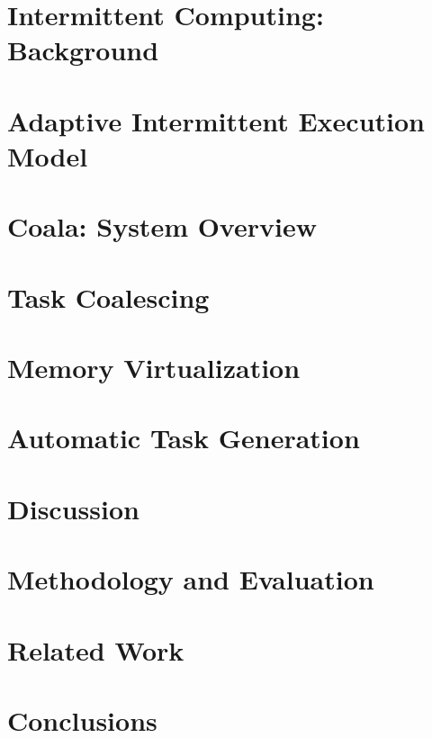 \documentclass[acmsmall,review,anonymous]{acmart}\settopmatter{printfolios=true,printccs=false,printacmref=false}
\newcommand{\sys}{Coala\xspace}
\begin{document}


\section{Intermittent Computing: Background}
\label{sec:background}


\section{Adaptive Intermittent Execution Model}
\label{sec:adaptiveModel}


\section{\sys: System Overview}
\label{sec:overall_system}



\section{Task Coalescing}
\label{sec:task_coalescing}

%


\section{Memory Virtualization}
\label{sec:memory_virtulaization}



\section{Automatic Task Generation}
\label{sec:compiler}



\section{Discussion}
\label{sec:discussion}



\section{Methodology and Evaluation}
\label{sec:methodology_evaluation}



\section{Related Work}
\label{sec:related_work}



\section{Conclusions}
\label{sec:conclusions}




\end{document}
